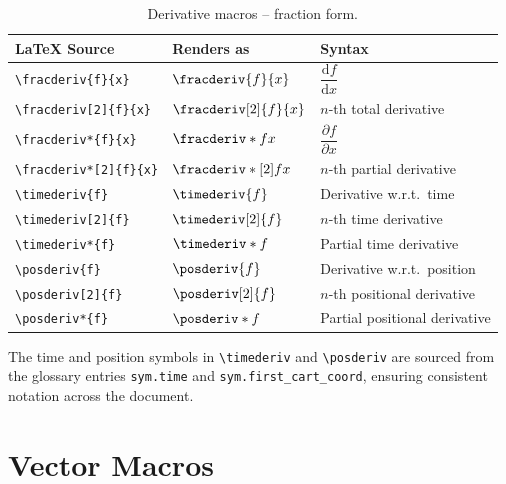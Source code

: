 \begin{table}[htbp]
  \centering
  \caption{Derivative macros -- fraction form.}
  \label{tab:deriv-fractions}
  \begin{tabular}{@{}llp{}@{}}
    \toprule
    LaTeX Source & Renders as & Syntax \\
    \midrule
    \texttt{\textbackslash fracderiv\{f\}\{x\}}       & $\fracderiv{f}{x}$       & $\dfrac{\mathup{d}f}{\mathup{d}x}$ \\
    \texttt{\textbackslash fracderiv[2]\{f\}\{x\}}    & $\fracderiv[2]{f}{x}$    & $n$-th total derivative \\
    \texttt{\textbackslash fracderiv*\{f\}\{x\}}      & $\fracderiv*{f}{x}$      & $\dfrac{\partial f}{\partial x}$ \\
    \texttt{\textbackslash fracderiv*[2]\{f\}\{x\}}   & $\fracderiv*[2]{f}{x}$   & $n$-th partial derivative \\
    \texttt{\textbackslash timederiv\{f\}}            & $\timederiv{f}$          & Derivative w.r.t.\ time \\
    \texttt{\textbackslash timederiv[2]\{f\}}         & $\timederiv[2]{f}$       & $n$-th time derivative \\
    \texttt{\textbackslash timederiv*\{f\}}           & $\timederiv*{f}$         & Partial time derivative \\
    \texttt{\textbackslash posderiv\{f\}}             & $\posderiv{f}$           & Derivative w.r.t.\ position \\
    \texttt{\textbackslash posderiv[2]\{f\}}          & $\posderiv[2]{f}$        & $n$-th positional derivative \\
    \texttt{\textbackslash posderiv*\{f\}}            & $\posderiv*{f}$          & Partial positional derivative \\
    \bottomrule
  \end{tabular}
\end{table}

The time and position symbols in \texttt{\textbackslash timederiv} and
\texttt{\textbackslash posderiv} are sourced from the glossary entries
\texttt{sym.time} and \texttt{sym.first\_cart\_coord}, ensuring
consistent notation across the document.

\section{Vector Macros}

